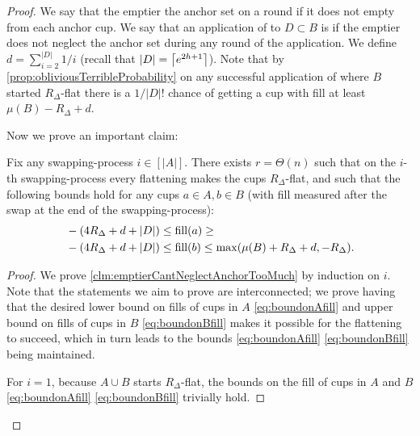 \begin{proof}
We say that the emptier  the anchor set on a round
if it does not empty from each anchor cup. We say that an
application of \randalg to $D\subset B$ is  if
the emptier does not neglect the anchor set during any round of
the application. We define $d = \sum_{i=2}^{|D|} 1/i$ (recall
that $|D| = \left\lceil e^{2h+1} \right\rceil$). Note that by
\cref{prop:obliviousTerribleProbability} on any successful
application of \randalg where $B$ started $R_\Delta$-flat there
is a $1/|D|!$ chance of getting a
cup with fill at least $\mu(B) -R_\Delta + d$. 

Now we prove an important claim:
\begin{clm}
  \label{clm:emptierCantNeglectAnchorTooMuch}
  Fix any swapping-process $i \in [|A|]$. 
  There exists $r = \Theta(n)$ such that on the $i$-th swapping-process every
  flattening makes the cups $R_\Delta$-flat, and such that the
  following bounds hold for any cups $a\in A, b\in B$ (with fill
  measured after the swap at the end of the swapping-process):
  \begin{align}
    & -(4R_\Delta + d + |D|) \le \operatorname{\textnormal{fill}}(a) \ge  \label{eq:boundonAfill}\\
    & -(4R_\Delta + d + |D|) \le \operatorname{\textnormal{fill}}(b) \le \max(\mu(B) + R_\Delta + d, -R_\Delta). \label{eq:boundonBfill}
  \end{align}

\end{clm}
\begin{proof}

  We prove \cref{clm:emptierCantNeglectAnchorTooMuch} by
  induction on $i$. Note that the statements we aim to prove are
  interconnected; we prove having that the desired lower bound on
  fills of cups in $A$ \eqref{eq:boundonAfill} and upper bound on
  fills of cups in $B$ \eqref{eq:boundonBfill} makes it possible
  for the flattening to succeed, which in turn leads to the
  bounds \eqref{eq:boundonAfill} \eqref{eq:boundonBfill} being
  maintained.

  For $i=1$, because $A\cup B$ starts $R_\Delta$-flat, the bounds
  on the fill of cups in $A$ and $B$ \eqref{eq:boundonAfill}
  \eqref{eq:boundonBfill} trivially hold.


\end{proof}
\end{proof}
